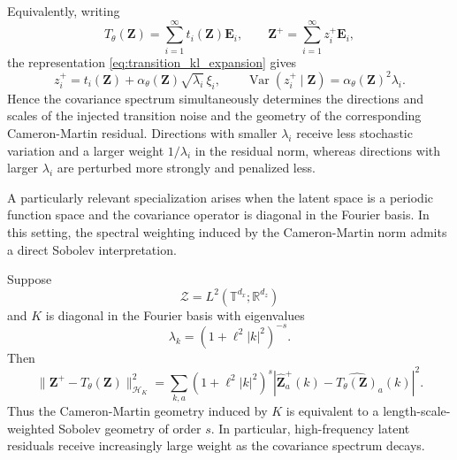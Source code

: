 \documentclass[11pt]{article}
\begin{document}
\begin{remark}
Equivalently, writing
\[
    T_\theta(\mathbf Z)=\sum_{i=1}^{\infty}t_i(\mathbf Z)\mathbf E_i,\qquad\mathbf Z^+=\sum_{i=1}^{\infty}z_i^+\mathbf E_i,
\]
the representation \eqref{eq:transition_kl_expansion} gives
\[
    z_i^+=t_i(\mathbf Z)+\alpha_\theta(\mathbf Z)\sqrt{\lambda_i}\,\xi_i,\qquad
    \operatorname{Var}(z_i^+\mid\mathbf Z)=\alpha_\theta(\mathbf Z)^2\lambda_i.
\]
Hence the covariance spectrum simultaneously determines the directions and scales of the injected transition noise and the geometry of the corresponding Cameron-Martin residual. Directions with smaller $\lambda_i$ receive less stochastic variation and a larger weight $1/\lambda_i$ in the residual norm, whereas directions with larger $\lambda_i$ are perturbed more strongly and penalized less.
\end{remark}

A particularly relevant specialization arises when the latent space is a periodic function space and the covariance operator is diagonal in the Fourier basis. In this setting, the spectral weighting induced by the Cameron-Martin norm admits a direct Sobolev interpretation.

\begin{corollary}
\label{cor:sobolev_residual_control}
Suppose
\[
    \mathcal Z=L^2(\mathbb T^{d_x};\mathbb R^{d_z})
\]
and $K$ is diagonal in the Fourier basis with eigenvalues
\[
    \lambda_k=(1+\ell^2|k|^2)^{-s}.
\]
Then
\begin{equation}
    \|\mathbf Z^+-T_\theta(\mathbf Z)\|_{\mathcal H_K}^2
    =\sum_{k,a}(1+\ell^2|k|^2)^s
    \left|\widehat{\mathbf Z}^+_a(k)-\widehat{T_\theta(\mathbf Z)}_a(k)\right|^2.
    \label{eq:sobolev_latent_residual}
\end{equation}
Thus the Cameron-Martin geometry induced by $K$ is equivalent to a length-scale-weighted Sobolev geometry of order $s$. In particular, high-frequency latent residuals receive increasingly large weight as the covariance spectrum decays.
\end{corollary}
\end{document}
